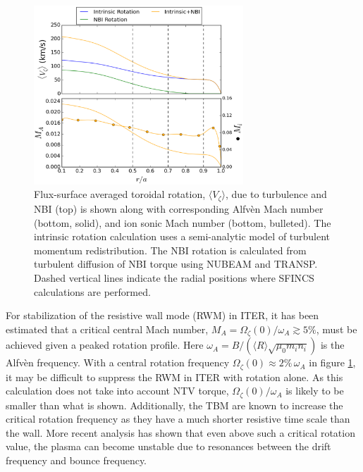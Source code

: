 \documentclass[aip, pop, preprint]{revtex4-1}
\numberwithin{figure}{section}
\numberwithin{equation}{section}
\begin{document}
\FloatBarrier

\begin{figure}[h!]
\centering
\includegraphics[width=0.7\textwidth]{figure4.eps}
\caption{\label{fig:rotation_estimate} Flux-surface averaged toroidal rotation, $\langle V_{\zeta} \rangle$, due to turbulence and NBI (top) is shown along with  corresponding Alfv\`{e}n Mach number (bottom, solid), and ion sonic Mach number (bottom, bulleted). The intrinsic rotation calculation uses a semi-analytic model of turbulent momentum redistribution.\cite{Hillesheim2015} The NBI rotation is calculated from turbulent diffusion of NBI torque using NUBEAM and TRANSP.\cite{Poli2014} Dashed vertical lines indicate the radial positions where SFINCS calculations are performed. }
\end{figure}

For stabilization of the resistive wall mode (RWM) in ITER, it has been estimated \cite{Liu2004} that a critical central Mach number, $M_A = \Omega_{\zeta}(0)/\omega_A \gtrsim 5\%$, must be achieved given a peaked rotation profile. Here $\omega_A = B/(\langle R\rangle\sqrt{\mu_0 m_i n_i})$ is the Alfv\`{e}n frequency. With a central rotation frequency $\Omega_{\zeta}(0) \approx 2\% \, \omega_A$ in figure \ref{fig:rotation_estimate}, it may be difficult to suppress the RWM in ITER with rotation alone. As this calculation does not take into account NTV torque, $\Omega_{\zeta}(0)/\omega_A$ is likely to be smaller than what is shown. Additionally, the TBM are known to increase the critical rotation frequency as they have a much shorter resistive time scale than the wall.\cite{Liu2004} More recent analysis has shown that even above such a critical rotation value, the plasma can become unstable due to resonances between the drift frequency and bounce frequency.\cite{Berkery2010, Liu2009}
\end{document}
